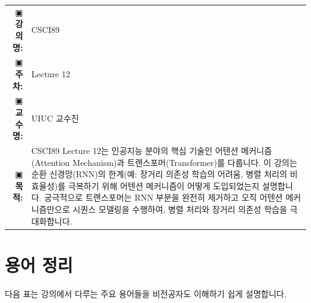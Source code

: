 \documentclass[11pt,a4paper]{article}
\makeatletter
\theoremstyle{definition}
\newcommand{\metainfo}[4]{
\begin{tcolorbox}[
    colback=lightpurple,
    colframe=darkpurple,
    boxrule=1pt,
    arc=2mm,
    left=10pt,
    right=10pt,
    top=8pt,
    bottom=8pt
]
\begin{tabular}{@{}rl@{}}
▣ \textbf{강의명:} & #1 \\[0.3em]
▣ \textbf{주차:} & #2 \\[0.3em]
▣ \textbf{교수명:} & #3 \\[0.3em]
▣ \textbf{목적:} & \begin{minipage}[t]{0.75\textwidth}#4\end{minipage}
\end{tabular}
\end{tcolorbox}
}
\makeatother
\begin{document}
\thispagestyle{firstpage}

\metainfo{CSCI89}{Lecture 12}{UIUC 교수진}{CSCI89 Lecture 12는 인공지능 분야의 핵심 기술인 어텐션 메커니즘(Attention Mechanism)과 트랜스포머(Transformer)를 다룹니다. 이 강의는 순환 신경망(RNN)의 한계(예: 장거리 의존성 학습의 어려움, 병렬 처리의 비효율성)를 극복하기 위해 어텐션 메커니즘이 어떻게 도입되었는지 설명합니다. 궁극적으로 트랜스포머는 RNN 부분을 완전히 제거하고 오직 어텐션 메커니즘만으로 시퀀스 모델링을 수행하여, 병렬 처리와 장거리 의존성 학습을 극대화합니다.}

\tableofcontents

\newpage
\section{용어 정리}
다음 표는 강의에서 다루는 주요 용어들을 비전공자도 이해하기 쉽게 설명합니다.
\end{document}
